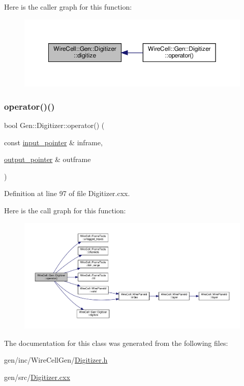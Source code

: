 Here is the caller graph for this function\+:
\nopagebreak
\begin{figure}[H]
\begin{center}
\leavevmode
\includegraphics[width=350pt]{class_wire_cell_1_1_gen_1_1_digitizer_a0280442eb3c74a29e73899d976aa83f6_icgraph}
\end{center}
\end{figure}
\mbox{\label{class_wire_cell_1_1_gen_1_1_digitizer_a06ba39eb87a8acb50a3311f290d814a4}} 
\subsubsection{\texorpdfstring{operator()()}{operator()()}}
{\footnotesize\ttfamily bool Gen\+::\+Digitizer\+::operator() (\begin{DoxyParamCaption}\item[{const \hyperlink{class_wire_cell_1_1_i_function_node_a55c0946156df9b712b8ad1a0b59b2db6}{input\+\_\+pointer} \&}]{inframe,  }\item[{\hyperlink{class_wire_cell_1_1_i_function_node_afc02f1ec60d31aacddf64963f9ca650b}{output\+\_\+pointer} \&}]{outframe }\end{DoxyParamCaption})\hspace{0.3cm}{\ttfamily [virtual]}}



Definition at line 97 of file Digitizer.\+cxx.

Here is the call graph for this function\+:
\nopagebreak
\begin{figure}[H]
\begin{center}
\leavevmode
\includegraphics[width=350pt]{class_wire_cell_1_1_gen_1_1_digitizer_a06ba39eb87a8acb50a3311f290d814a4_cgraph}
\end{center}
\end{figure}


The documentation for this class was generated from the following files\+:\begin{DoxyCompactItemize}
\item 
gen/inc/\+Wire\+Cell\+Gen/\hyperlink{_digitizer_8h}{Digitizer.\+h}\item 
gen/src/\hyperlink{_digitizer_8cxx}{Digitizer.\+cxx}\end{DoxyCompactItemize}
